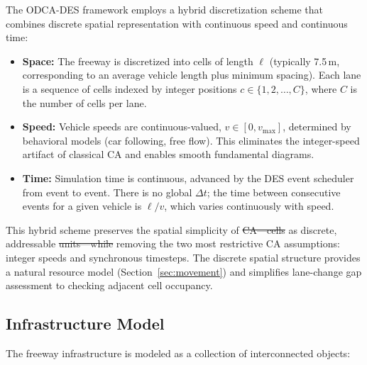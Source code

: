 \documentclass[review,authoryear]{elsarticle}
\providecommand{\DIFaddtex}[1]{{\protect\color{blue}\uwave{#1}}} %
\providecommand{\DIFdeltex}[1]{{\protect\color{red}\sout{#1}}}                      %
\providecommand{\DIFaddbegin}{} %
\providecommand{\DIFaddend}{} %
\providecommand{\DIFdelbegin}{} %
\providecommand{\DIFdelend}{} %
\providecommand{\DIFadd}[1]{\texorpdfstring{\DIFaddtex{#1}}{#1}} %
\providecommand{\DIFdel}[1]{\texorpdfstring{\DIFdeltex{#1}}{}} %
\newcommand{\DIFscaledelfig}{0.5}
\newlength{\DIFdelgraphicswidth} %
\newlength{\DIFdelgraphicsheight} %
\newcommand{\DIFaddincludegraphics}[2][]{{\color{blue}\fbox{\DIFOincludegraphics[#1]{#2}}}} %
\newcommand{\DIFdelincludegraphics}[2][]{%
\sbox{\DIFdelgraphicsbox}{\DIFOincludegraphics[#1]{#2}}%
\settoboxwidth{\DIFdelgraphicswidth}{\DIFdelgraphicsbox} %
\settoboxtotalheight{\DIFdelgraphicsheight}{\DIFdelgraphicsbox} %
\scalebox{\DIFscaledelfig}{%
\parbox[b]{\DIFdelgraphicswidth}{\usebox{\DIFdelgraphicsbox}\\[-\baselineskip] \rule{\DIFdelgraphicswidth}{0em}}\llap{\resizebox{\DIFdelgraphicswidth}{\DIFdelgraphicsheight}{%
\setlength{\unitlength}{\DIFdelgraphicswidth}%
\begin{picture}(1,1)%
\thicklines\linethickness{2pt} %
{\color[rgb]{1,0,0}\put(0,0){\framebox(1,1){}}}%
{\color[rgb]{1,0,0}\put(0,0){\line( 1,1){1}}}%
{\color[rgb]{1,0,0}\put(0,1){\line(1,-1){1}}}%
\end{picture}%
}\hspace*{3pt}}} %
} %
\DeclareRobustCommand{\DIFaddbegin}{\DIFOaddbegin \let\includegraphics\DIFaddincludegraphics} %
\DeclareRobustCommand{\DIFaddend}{\DIFOaddend \let\includegraphics\DIFOincludegraphics} %
\DeclareRobustCommand{\DIFdelbegin}{\DIFOdelbegin \let\includegraphics\DIFdelincludegraphics} %
\DeclareRobustCommand{\DIFdelend}{\DIFOaddend \let\includegraphics\DIFOincludegraphics} %
\begin{document}
The ODCA-DES framework employs a hybrid discretization scheme that combines discrete spatial representation with continuous speed and continuous time:

\begin{itemize}
    \item \textbf{Space:} The freeway is discretized into cells of length $\ell$ (typically 7.5\,m, corresponding to an average vehicle length plus minimum spacing). Each lane is a sequence of cells indexed by integer positions $c \in \{1, 2, \ldots, C\}$, where $C$ is the number of cells per lane.

    \item \textbf{Speed:} Vehicle speeds are continuous-valued, $v \in [0, v_{\max}]$, determined by behavioral models (car following, free flow). This eliminates the integer-speed artifact of classical CA and enables smooth fundamental diagrams.

    \item \textbf{Time:} Simulation time is continuous, advanced by the DES event scheduler from event to event. There is no global $\Delta t$; the time between consecutive events for a given vehicle is $\ell / v$, which varies continuously with speed.
\end{itemize}

This hybrid scheme preserves the spatial simplicity of \DIFdelbegin \DIFdel{CA---cells }\DIFdelend \DIFaddbegin \DIFadd{CA (cells }\DIFaddend as discrete, addressable \DIFdelbegin \DIFdel{units---while }\DIFdelend \DIFaddbegin \DIFadd{units) while }\DIFaddend removing the two most restrictive CA assumptions: integer speeds and synchronous timesteps. The discrete spatial structure provides a natural resource model (Section~\ref{sec:movement}) and simplifies lane-change gap assessment to checking adjacent cell occupancy.

\subsection{Infrastructure Model}
\label{sec:infrastructure}

The freeway infrastructure is modeled as a collection of interconnected objects:
\end{document}
